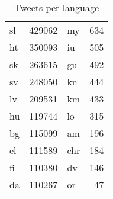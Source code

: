 \documentclass[a4paper,11pt]{article}
\begin{document}
\begin{table}
\begin{tabular}{|l|r||l|r|}
sl & 429062 &                       my & 634 \\
ht & 350093 &                       iu & 505 \\
sk & 263615 &                       gu & 492 \\
sv & 248050 &                       kn & 444 \\
lv & 209531 &                       km & 433 \\
hu & 119744 &                       lo & 315 \\
bg & 115099 &                       am & 196 \\
el & 111589 &                       chr & 184 \\
fi & 110380 &                       dv & 146 \\
da & 110267 &                       or & 47 \\
\hline
\end{tabular}
\label{twperlang}
\caption{Tweets per language}
\end{table}
\end{document}
